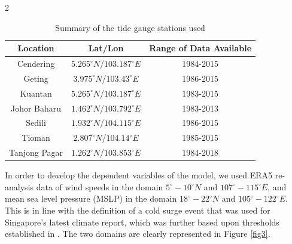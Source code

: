 \documentclass[12pt]{article}
\begin{document}
\begin{multicols}{2}
    \begin{table}[htbp]
     \begin{center}
        \begin{tabular}{||c c c||} 
         \hline
         Location & Lat/Lon & Range of Data Available \\ [0.5ex] 
         \hline\hline
         Cendering & $5.265^\circ N$/$103.187^\circ E$ & 1984-2015 \\ 
         \hline
         Geting & $3.975^\circ N$/$103.43^\circ E$ & 1986-2015 \\
         \hline
         Kuantan & $5.265^\circ N$/$103.187^\circ E$ & 1983-2015 \\
         \hline
         Johor Baharu & $1.462^\circ N$/$103.792^\circ E$ &  1983-2013 \\
         \hline
         Sedili & $1.932^\circ N$/$104.115^\circ E$ & 1986-2015 \\
         \hline
         Tioman & $2.807^\circ N$/$104.14^\circ E$ & 1985-2015  \\
         \hline
         Tanjong Pagar & $1.262^\circ N$/$103.853^\circ E$ &  1984-2018 \\ [1ex]
         \hline
        \end{tabular}
        \caption{Summary of the tide gauge stations used}
        \label{table_1}
        \end{center}
        
    \end{table}

    \begin{paragraph}
        \noindent In order to develop the dependent variables of the model, we used ERA5 re-analysis data \cite{Hersbach_2020} of wind speeds in the domain $5^\circ - 10^\circ N$ and $107^\circ - 115^\circ E$, and mean sea level pressure (MSLP) in the domain $18^\circ - 22^\circ N$ and $105^\circ - 122^\circ E$. This is in line with the definition of a cold surge event that was used for Singapore's latest climate report, which was further based upon thresholds established in \cite{Lim2017_MonsoonRainfall}. The two domains are clearly represented in Figure \ref{fig3}.
    \end{paragraph}
    

\end{multicols}
\end{document}
